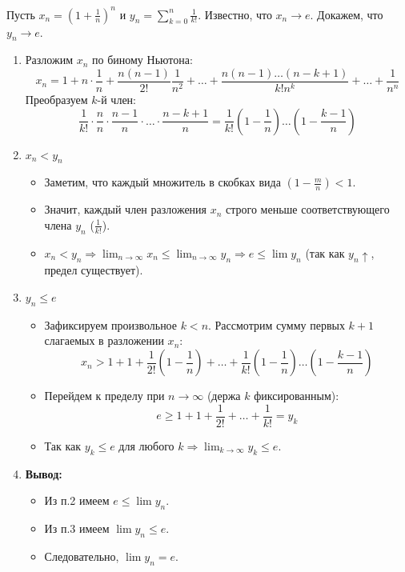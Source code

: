 \begin{tcolorbox}[title=Доказательство]
	Пусть $x_n = \left(1 + \frac{1}{n}\right)^n$ и $y_n = \sum_{k=0}^n \frac{1}{k!}$. Известно, что $x_n \to e$. Докажем, что $y_n \to e$.
	\begin{enumerate}
		\item Разложим $x_n$ по биному Ньютона:
			$$x_n = 1 + n\cdot\frac{1}{n} + \frac{n(n-1)}{2!}\frac{1}{n^2} + \dots + \frac{n(n-1)\dots(n-k+1)}{k! n^k} + \dots + \frac{1}{n^n}$$
			Преобразуем $k$-й член:
			$$\frac{1}{k!} \cdot \frac{n}{n} \cdot \frac{n-1}{n} \cdot \dots \cdot \frac{n-k+1}{n} = \frac{1}{k!} \left(1 - \frac{1}{n}\right)\dots\left(1 - \frac{k-1}{n}\right)$$
		\item $x_n < y_n$
			\begin{itemize}
				\item Заметим, что каждый множитель в скобках вида $\left(1 - \frac{m}{n}\right) < 1$.
				\item Значит, каждый член разложения $x_n$ строго меньше соответствующего члена $y_n$ ($\frac{1}{k!}$).
				\item $x_n < y_n \Rightarrow \lim_{n\to\infty} x_n \leq \lim_{n\to\infty} y_n \Rightarrow e \leq \lim y_n$ (так как $y_n \uparrow$, предел существует).
			\end{itemize}
		\item $y_n \leq e$
			\begin{itemize}
				\item Зафиксируем произвольное $k < n$. Рассмотрим сумму первых $k+1$ слагаемых в разложении $x_n$:
				$$x_n > 1 + 1 + \frac{1}{2!}(1 - \frac{1}{n}) + \dots + \frac{1}{k!}(1 - \frac{1}{n})\dots(1 - \frac{k-1}{n})$$
				\item Перейдем к пределу при $n \to \infty$ (держа $k$ фиксированным):
				$$e \geq 1 + 1 + \frac{1}{2!} + \dots + \frac{1}{k!} = y_k$$
				\item Так как $y_k \leq e$ для любого $k \Rightarrow \lim_{k\to\infty} y_k \leq e$.
			\end{itemize}
		\item \textbf{Вывод:}
			\begin{itemize}
				\item Из п.2 имеем $e \leq \lim y_n$.
				\item Из п.3 имеем $\lim y_n \leq e$.
				\item Следовательно, $\lim y_n = e$.
			\end{itemize}
	\end{enumerate}
\end{tcolorbox}

